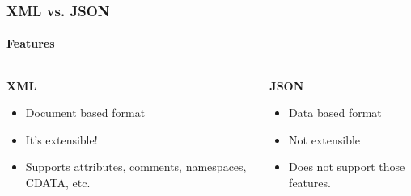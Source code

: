 \documentclass[
    alternativetitlepage=bild,
    cornerlogo=hgi_nds_logo2,
    sectionoverview,
]{rubpresentation}
\begin{document}
\begin{frame}[plain]
    \frametitle{XML vs. JSON}
    \framesubtitle{Features}
    \begin{columns}[t]
        \begin{column}{0.5\textwidth}
            \begin{center}\textbf{\Large XML}\end{center}
            \begin{itemize}
                \item{} Document based format\\
                \item{} It's extensible!\\
                \item{} Supports attributes, comments, namespaces, CDATA, etc.
            \end{itemize}
        \end{column}
        \begin{column}{0.5\textwidth}
            \begin{center}\textbf{\Large JSON}\end{center}
            \begin{itemize}
                \item{} Data based format\\
                \item{} Not extensible\\
                \item{} Does not support those features.
            \end{itemize}
        \end{column}
    \end{columns}
\end{frame}
\end{document}
